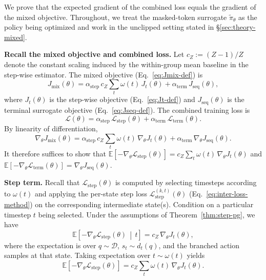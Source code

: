 \documentclass{article}
\theoremstyle{plain}
\theoremstyle{definition}
\theoremstyle{remark}
\begin{document}
We prove that the expected gradient of the combined loss equals the gradient of the mixed objective.
Throughout, we treat the masked-token surrogate $\tilde{\pi}_\theta$ as the policy being optimized and work in the unclipped setting stated in \S\ref{sec:theory-mixed}.

\textbf{Recall the mixed objective and combined loss.}
Let $c_Z := (Z-1)/Z$ denote the constant scaling induced by the within-group mean baseline in the step-wise estimator.
The mixed objective (Eq.~\ref{eq:Jmix-def}) is
\[
  J_{\text{mix}}(\theta)
  =
  \alpha_{\text{step}}\,c_Z\sum_t \omega(t)\,J_t(\theta)
  +
  \alpha_{\text{term}}\,J_{\text{seq}}(\theta),
\]
where $J_t(\theta)$ is the step-wise objective (Eq.~\ref{eq:Jt-def}) and $J_{\text{seq}}(\theta)$ is the terminal surrogate objective (Eq.~\ref{eq:Jseq-def}).
The combined training loss is
\[
  \mathcal{L}(\theta)
  =
  \alpha_{\text{step}}\,\mathcal{L}_{\text{step}}(\theta)
  +
  \alpha_{\text{term}}\,\mathcal{L}_{\text{term}}(\theta).
\]
By linearity of differentiation,
\begin{equation}
  \nabla_\theta J_{\text{mix}}(\theta)
  =
  \alpha_{\text{step}}\,c_Z\sum_t \omega(t)\,\nabla_\theta J_t(\theta)
  +
  \alpha_{\text{term}}\,\nabla_\theta J_{\text{seq}}(\theta).
  \label{eq:app-mixed-grad-decomp}
\end{equation}
It therefore suffices to show that
\(
\mathbb{E}\!\left[-\nabla_\theta \mathcal{L}_{\text{step}}(\theta)\right]
=
c_Z\sum_t \omega(t)\,\nabla_\theta J_t(\theta)
\)
and
\(
\mathbb{E}\!\left[-\nabla_\theta \mathcal{L}_{\text{term}}(\theta)\right]
=
\nabla_\theta J_{\text{seq}}(\theta).
\)

\textbf{Step term.}
Recall that $\mathcal{L}_{\text{step}}(\theta)$ is computed by selecting timesteps according to $\omega(t)$ and applying the per-state step loss $\mathcal{L}_{\text{step}}^{(k,t)}(\theta)$ (Eq.~\ref{eq:inter-loss-method}) on the corresponding intermediate state(s).
Condition on a particular timestep $t$ being selected.
Under the assumptions of Theorem~\ref{thm:step-pg}, we have
\[
  \mathbb{E}\!\left[-\nabla_\theta \mathcal{L}_{\text{step}}(\theta)\,\middle|\, t\right]
  =
  c_Z\,\nabla_\theta J_t(\theta),
\]
where the expectation is over $q\sim\mathcal{D}$, $s_t\sim d_t(q)$, and the branched action samples at that state.
Taking expectation over $t\sim\omega(t)$ yields
\begin{equation}
\mathbb{E}\!\left[-\nabla_\theta \mathcal{L}_{\text{step}}(\theta)\right]
  =
  c_Z\sum_t \omega(t)\,\nabla_\theta J_t(\theta).
  \label{eq:app-step-term}
\end{equation}
\end{document}
